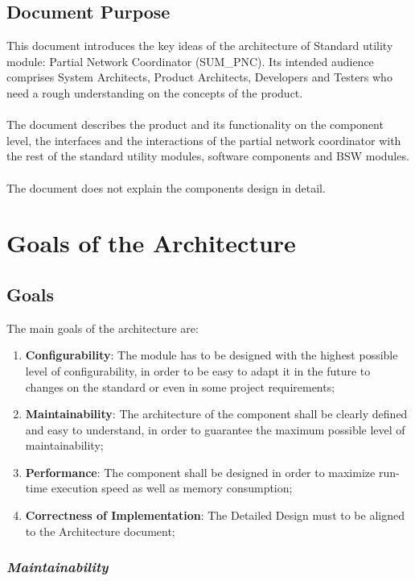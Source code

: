 \subsection{Document Purpose}
This document introduces the key ideas of the architecture of Standard utility module: Partial Network Coordinator (SUM\_PNC). Its intended audience comprises System Architects, Product Architects, Developers and Testers who need a rough understanding on the concepts of the product.
\\
\\
The document describes the product and its functionality on the component level, the interfaces and the interactions of the partial network coordinator with the rest of the standard utility modules, software components and BSW modules.
\\
\\
The document does not explain the components design in detail.

\section{Goals of the Architecture}

\subsection{Goals}
The main goals of the architecture are:

\begin{enumerate}
	\item \textbf{Configurability}: The module has to be designed with the highest possible level of configurability, in order to be easy to adapt it in the future to changes on the standard or even in some project requirements;
	\item \textbf{Maintainability}: The architecture of the component shall be clearly defined and easy to understand, in order to guarantee the maximum possible level of maintainability;
	\item \textbf{Performance}: The component shall be designed in order to maximize run-time execution speed as well as memory consumption;
	\item \textbf{Correctness of Implementation}: The Detailed Design must to be aligned to the Architecture document;
\end{enumerate}

\subsubsection{\textit{Maintainability}}

